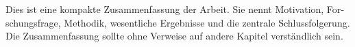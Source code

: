 \begin{otherlanguage}{ngerman}
\addchap{\ThesisStrSummary}

Dies ist eine kompakte Zusammenfassung der Arbeit.
Sie nennt Motivation, Forschungsfrage, Methodik, wesentliche Ergebnisse und die zentrale Schlussfolgerung.
Die Zusammenfassung sollte ohne Verweise auf andere Kapitel verständlich sein.

%
%
\end{otherlanguage}
